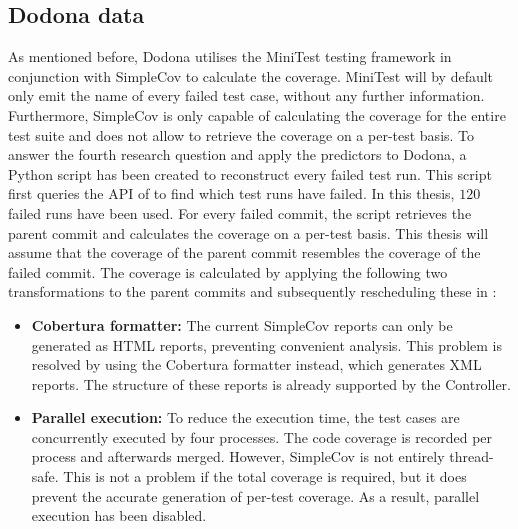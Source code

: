 
\subsection{Dodona data}
As mentioned before, Dodona utilises the MiniTest testing framework in conjunction with SimpleCov to calculate the coverage. MiniTest will by default only emit the name of every failed test case, without any further information. Furthermore, SimpleCov is only capable of calculating the coverage for the entire test suite and does not allow to retrieve the coverage on a per-test basis. To answer the fourth research question and apply the \velocity{} predictors to Dodona, a Python script has been created to reconstruct every failed test run. This script first queries the API of \githubactions{} to find which test runs have failed. In this thesis, $\SI{120}{}$ failed runs have been used. For every failed commit, the script retrieves the parent commit and calculates the coverage on a per-test basis. This thesis will assume that the coverage of the parent commit resembles the coverage of the failed commit. The coverage is calculated by applying the following two transformations to the parent commits and subsequently rescheduling these in \githubactions{}:

\begin{itemize}
	\item \textbf{Cobertura formatter:} The current SimpleCov reports can only be generated as HTML reports, preventing convenient analysis. This problem is resolved by using the Cobertura formatter instead, which generates XML reports. The structure of these reports is already supported by the Controller.
	
	\item \textbf{Parallel execution:} To reduce the execution time, the test cases are concurrently executed by four processes. The code coverage is recorded per process and afterwards merged. However, SimpleCov is not entirely thread-safe. This is not a problem if the total coverage is required, but it does prevent the accurate generation of per-test coverage. As a result, parallel execution has been disabled.
	
\end{itemize}